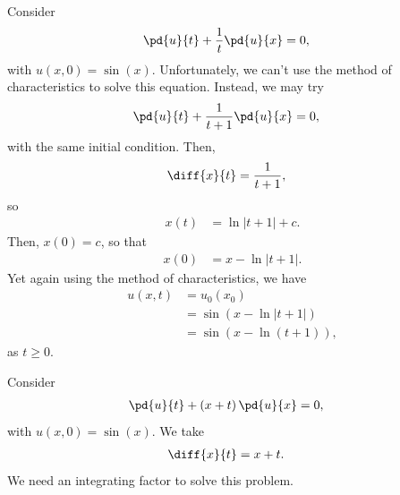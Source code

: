 \documentclass[10pt]{mypackage}
\begin{document}
\begin{example}
  Consider
  \begin{align*}
    \pd{u}{t} + \frac{1}{t} \pd{u}{x} &= 0,
  \end{align*}
  with $u\left( x,0 \right) = \sin(x)$. Unfortunately, we can't use the method of characteristics to solve this equation. Instead, we may try
  \begin{align*}
    \pd{u}{t} + \frac{1}{t + 1}\pd{u}{x} &= 0,
  \end{align*}
  with the same initial condition. Then, 
  \begin{align*}
    \diff{x}{t} &= \frac{1}{t+1},
  \end{align*}
  so
  \begin{align*}
    x(t) &= \ln\left\vert t+1 \right\vert + c.
  \end{align*}
  Then, $x(0) = c$, so that
  \begin{align*}
    x(0) &= x - \ln\left\vert t+1 \right\vert.
  \end{align*}
  Yet again using the method of characteristics, we have
  \begin{align*}
    u\left( x,t \right) &= u_0\left( x_0 \right)\\
                        &= \sin\left( x-\ln\left\vert t+1 \right\vert \right)\\
                        &= \sin\left( x-\ln\left( t+1 \right) \right),
  \end{align*}
  as $t \geq 0$.
\end{example}
\begin{example}
  Consider
  \begin{align*}
    \pd{u}{t} + \left( x + t \right)\pd{u}{x} &= 0,
  \end{align*}
  with $u\left( x,0 \right) = \sin(x)$. We take
  \begin{align*}
    \diff{x}{t} &= x + t.
  \end{align*}
  We need an integrating factor to solve this problem.
\end{example}
\end{document}
